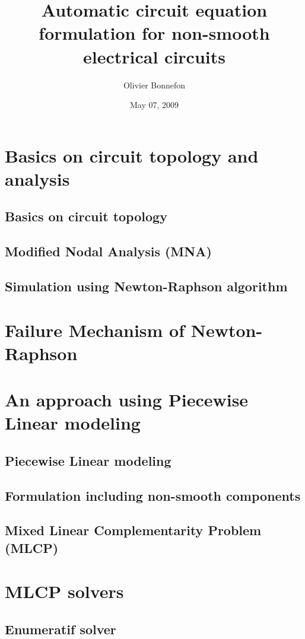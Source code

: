 \documentclass[8pt,xcolor*pst]{beamer}
\title{Automatic circuit equation formulation for non-smooth electrical circuits}
\author{Olivier Bonnefon}
\date{May 07, 2009}
\institute{BIPOP team, INRIA Rh\^one-Alpes}
\begin{document}
\frame{\titlepage}
\frame{\tableofcontents}%
\section{Basics on circuit topology and analysis}
\subsection{Basics on circuit topology}

\subsection{Modified Nodal Analysis (MNA)}

\subsection{Simulation using Newton-Raphson algorithm}

\section{Failure Mechanism of Newton-Raphson}

\section{An approach using Piecewise Linear modeling}
\subsection{Piecewise Linear modeling}

\subsection{Formulation including non-smooth components}

%
\subsection{Mixed Linear Complementarity Problem (MLCP)}

\section{MLCP solvers}
\subsection{Enumeratif solver}

\end{document}
